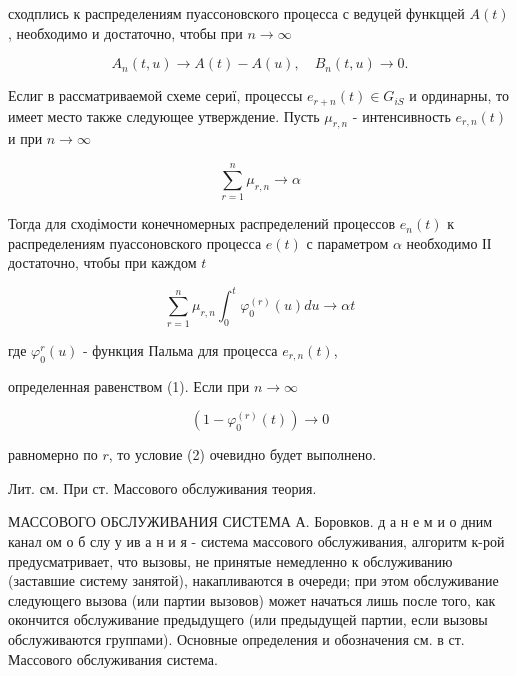 \documentclass[10pt]{article}
\begin{document}
сходплись к распределениям пуассоновского процесса с ведуцей функццей $A(t)$, необходимо и достаточно, чтобы при $n \rightarrow \infty$



\[

A_{n}(t, u) \longrightarrow A(t)-A(u), \quad B_{n}(t, u) \longrightarrow 0 .

\]



Еслиг в рассматриваемой схеме сериї, процессы $e_{r+n}(t) \in G_{i S}$ и ординарны, то имеет место также следующее утверждение. Пусть $\mu_{r, n}$ - интенсивность $e_{r, n}(t)$ и при $n \rightarrow \infty$



\[

\sum_{r=1}^{n} \mu_{r, n} \rightarrow \alpha

\]



Тогда для сходімости конечномерных распределений процессов $e_{n}(t)$ к распределениям пуассоновского процесса $e(t)$ с параметром $\alpha$ необходимо ІІ достаточно, чтобы при каждом $t$



\[

\sum_{r=1}^{n} \mu_{r, n} \int_{0}^{t} \varphi_{0}^{(r)}(u) d u \longrightarrow \alpha t

\]



где $\varphi_{0}^{r}(u)$ - функция Пальма для процесса $e_{r, n}(t)$,

определенная равенством (1). Если при $n \rightarrow \infty$



\[

\left(1-\varphi_{0}^{(r)}(t)\right) \rightarrow 0

\]



равномерно по $r$, то условие (2) очевидно будет выполнено.



Лит. см. При ст. Массового обслуживания теория.



МАССОВОГО ОБСЛУЖИВАНИЯ СИСТЕМА А. Боровков. д а н е м и о дним канал ом о б слу у ив а н и я - система массового обслуживания, алгоритм к-рой предусматривает, что вызовы, не принятые немедленно к обслуживанию (заставшие систему занятой), накапливаются в очереди; при этом обслуживание следующего вызова (или партии вызовов) может начаться лишь после того, как окончится обслуживание предыдущего (или предыдущей партии, если вызовы обслуживаются группами). Основные определения и обозначения см. в ст. Массового обслуживания система.
\end{document}
